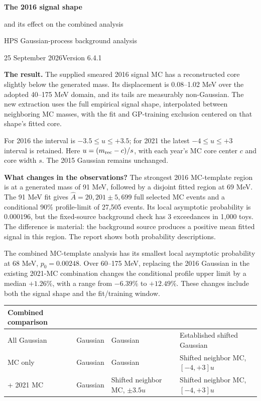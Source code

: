 \documentclass[11pt]{article}
\newcommand{\Ah}{\widehat A}\newcommand{\sh}{\widehat\sigma}
\begin{document}
{\LARGE\bfseries The 2016 signal shape\par and its effect on the combined analysis}\par
{\large HPS Gaussian-process background analysis}\par
25 September 2026\hfill Version 6.4.1

\textbf{The result.} The supplied smeared 2016 signal MC has a reconstructed core slightly below the generated mass. Its displacement is 0.08--1.02 MeV over the adopted 40--175 MeV domain, and its tails are measurably non-Gaussian. The new extraction uses the full empirical signal shape, interpolated between neighboring MC masses, with the fit and GP-training exclusion centered on that shape's fitted core.

For 2016 the interval is $-3.5\le u\le+3.5$; for 2021 the latest $-4\le u\le+3$ interval is retained. Here $u=(m_{\rm rec}-c)/s$, with each year's MC core center $c$ and core width $s$. The 2015 Gaussian remains unchanged.

\textbf{What changes in the observations?} The strongest 2016 MC-template region is at a generated mass of 91 MeV, followed by a disjoint fitted region at 69 MeV. The 91 MeV fit gives $\Ah=20{,}201\pm5{,}699$ full selected MC events and a conditional 90\% profile-limit of 27,505 events. Its local asymptotic probability is $0.000196$, but the fixed-source background check has 3 exceedances in 1,000 toys. The difference is material: the background source produces a positive mean fitted signal in this region. The report shows both probability descriptions.

The combined MC-template analysis has its smallest local asymptotic probability at 68 MeV, $p_0=0.00248$. Over 60--175 MeV, replacing the 2016 Gaussian in the existing 2021-MC combination changes the conditional profile upper limit by a median $+1.26\%$, with a range from $-6.39\%$ to $+12.49\%$. These changes include both the signal shape and the fit/training window.

\begin{center}\small\begin{tabular}{>{\raggedright\arraybackslash}p{1.30in}>{\raggedright\arraybackslash}p{1.12in}>{\raggedright\arraybackslash}p{1.12in}>{\raggedright\arraybackslash}p{1.75in}}\toprule
Combined comparison & 2015 & 2016 & 2021\\\midrule
All Gaussian & Gaussian & Gaussian & Established shifted Gaussian\\
2021 MC only & Gaussian & Gaussian & Shifted neighbor MC, $[-4,+3]u$\\
2016 + 2021 MC & Gaussian & Shifted neighbor MC, $\pm3.5u$ & Shifted neighbor MC, $[-4,+3]u$\\\bottomrule
\end{tabular}\end{center}
\end{document}
